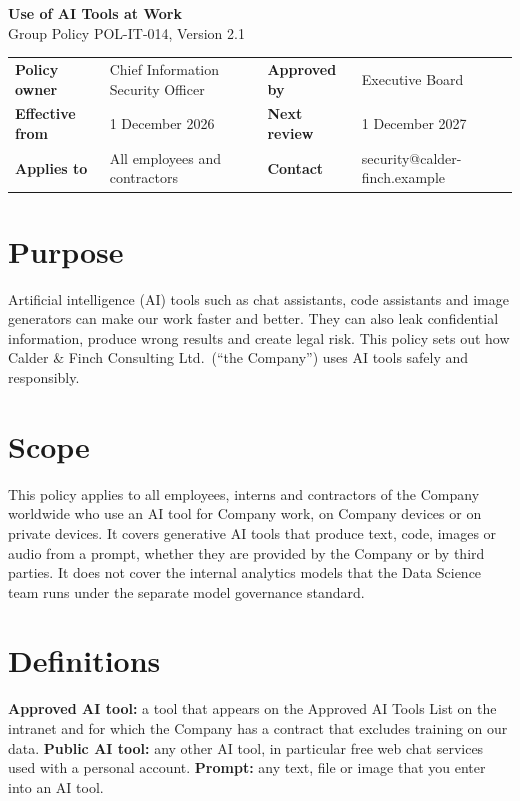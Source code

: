 \documentclass[10.5pt,a4paper]{article}
\begin{document}
{\sffamily\color{cf}\fontsize{22}{26}\selectfont\bfseries Use of AI Tools at Work}\\[0.3em]
{\sffamily\large Group Policy POL-IT-014, Version 2.1}

\vspace{0.3em}
\begin{tabularx}{\linewidth}{@{}>{\sffamily\bfseries\small}l X >{\sffamily\bfseries\small}l X@{}}
  \toprule
  Policy owner & Chief Information Security Officer & Approved by & Executive Board \\
  Effective from & 1 December 2026 & Next review & 1 December 2027 \\
  Applies to & All employees and contractors & Contact & security@calder-finch.example \\
  \bottomrule
\end{tabularx}

\section{Purpose}
Artificial intelligence (AI) tools such as chat assistants, code assistants and image generators can make our work
faster and better. They can also leak confidential information, produce wrong results and create legal risk.
This policy sets out how Calder \& Finch Consulting Ltd.\ (``the Company'') uses AI tools safely and responsibly.

\section{Scope}
This policy applies to all employees, interns and contractors of the Company worldwide who use an AI tool for
Company work, on Company devices or on private devices. It covers generative AI tools that produce text, code, images
or audio from a prompt, whether they are provided by the Company or by third parties. It does not cover
the internal analytics models that the Data Science team runs under the separate model governance standard.

\section{Definitions}
\textbf{Approved AI tool:} a tool that appears on the Approved AI Tools List on the intranet and for which the Company
has a contract that excludes training on our data. \textbf{Public AI tool:} any other AI tool, in particular free web
chat services used with a personal account. \textbf{Prompt:} any text, file or image that you enter into an AI tool.
\end{document}
